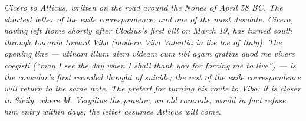 
\textit{Cicero to Atticus, written on the road around the
Nones of April 58 BC. The shortest letter of the exile
correspondence, and one of the most desolate. Cicero, having
left Rome shortly after Clodius's first bill on March 19, has
turned south through Lucania toward Vibo (modern Vibo
Valentia in the toe of Italy). The opening line ---
\textit{utinam illum diem videam cum tibi agam gratias quod
me vivere coegisti} (``may I see the day when I shall thank
you for forcing me to live'') --- is the consular's first
recorded thought of suicide; the rest of the exile
correspondence will return to the same note. The pretext for
turning his route to Vibo: it is closer to Sicily, where M.
Vergilius the praetor, an old comrade, would in fact refuse
him entry within days; the letter assumes Atticus will come.}
